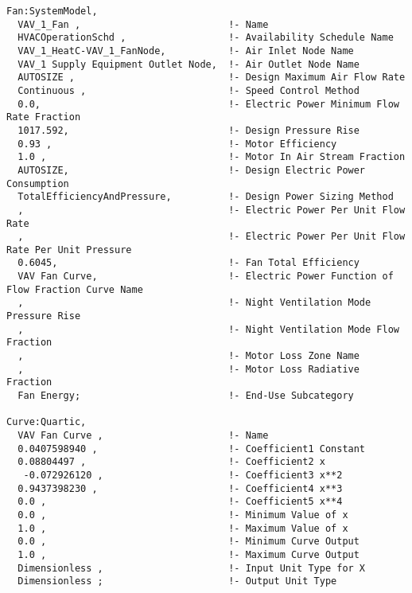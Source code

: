 \begin{lstlisting}
Fan:SystemModel,
  VAV_1_Fan ,                          !- Name
  HVACOperationSchd ,                  !- Availability Schedule Name
  VAV_1_HeatC-VAV_1_FanNode,           !- Air Inlet Node Name
  VAV_1 Supply Equipment Outlet Node,  !- Air Outlet Node Name
  AUTOSIZE ,                           !- Design Maximum Air Flow Rate
  Continuous ,                         !- Speed Control Method
  0.0,                                 !- Electric Power Minimum Flow Rate Fraction
  1017.592,                            !- Design Pressure Rise
  0.93 ,                               !- Motor Efficiency
  1.0 ,                                !- Motor In Air Stream Fraction
  AUTOSIZE,                            !- Design Electric Power Consumption
  TotalEfficiencyAndPressure,          !- Design Power Sizing Method
  ,                                    !- Electric Power Per Unit Flow Rate
  ,                                    !- Electric Power Per Unit Flow Rate Per Unit Pressure
  0.6045,                              !- Fan Total Efficiency
  VAV Fan Curve,                       !- Electric Power Function of Flow Fraction Curve Name
  ,                                    !- Night Ventilation Mode Pressure Rise
  ,                                    !- Night Ventilation Mode Flow Fraction
  ,                                    !- Motor Loss Zone Name
  ,                                    !- Motor Loss Radiative Fraction
  Fan Energy;                          !- End-Use Subcategory

Curve:Quartic,
  VAV Fan Curve ,                      !- Name
  0.0407598940 ,                       !- Coefficient1 Constant
  0.08804497 ,                         !- Coefficient2 x
   -0.072926120 ,                      !- Coefficient3 x**2
  0.9437398230 ,                       !- Coefficient4 x**3
  0.0 ,                                !- Coefficient5 x**4
  0.0 ,                                !- Minimum Value of x
  1.0 ,                                !- Maximum Value of x
  0.0 ,                                !- Minimum Curve Output
  1.0 ,                                !- Maximum Curve Output
  Dimensionless ,                      !- Input Unit Type for X
  Dimensionless ;                      !- Output Unit Type


\end{lstlisting}
